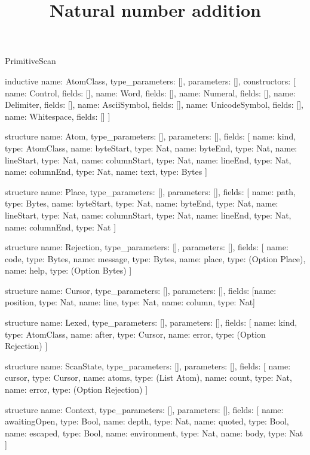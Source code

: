 \begin{lexlean}{PrimitiveScan}
\title{Natural number addition}
\begin{semanticmodule}
inductive{
  name: AtomClass,
  type_parameters: [],
  parameters: [],
  constructors: [
    {name: Control, fields: []},
    {name: Word, fields: []},
    {name: Numeral, fields: []},
    {name: Delimiter, fields: []},
    {name: AsciiSymbol, fields: []},
    {name: UnicodeSymbol, fields: []},
    {name: Whitespace, fields: []}
  ]
}

structure{
  name: Atom,
  type_parameters: [],
  parameters: [],
  fields: [
    {name: kind, type: AtomClass},
    {name: byteStart, type: Nat},
    {name: byteEnd, type: Nat},
    {name: lineStart, type: Nat},
    {name: columnStart, type: Nat},
    {name: lineEnd, type: Nat},
    {name: columnEnd, type: Nat},
    {name: text, type: Bytes}
  ]
}

structure{
  name: Place,
  type_parameters: [],
  parameters: [],
  fields: [
    {name: path, type: Bytes},
    {name: byteStart, type: Nat},
    {name: byteEnd, type: Nat},
    {name: lineStart, type: Nat},
    {name: columnStart, type: Nat},
    {name: lineEnd, type: Nat},
    {name: columnEnd, type: Nat}
  ]
}

structure{
  name: Rejection,
  type_parameters: [],
  parameters: [],
  fields: [
    {name: code, type: Bytes},
    {name: message, type: Bytes},
    {name: place, type: (Option Place)},
    {name: help, type: (Option Bytes)}
  ]
}

structure{
  name: Cursor,
  type_parameters: [],
  parameters: [],
  fields: [{name: position, type: Nat}, {name: line, type: Nat}, {name: column, type: Nat}]
}

structure{
  name: Lexed,
  type_parameters: [],
  parameters: [],
  fields: [
    {name: kind, type: AtomClass},
    {name: after, type: Cursor},
    {name: error, type: (Option Rejection)}
  ]
}

structure{
  name: ScanState,
  type_parameters: [],
  parameters: [],
  fields: [
    {name: cursor, type: Cursor},
    {name: atoms, type: (List Atom)},
    {name: count, type: Nat},
    {name: error, type: (Option Rejection)}
  ]
}

structure{
  name: Context,
  type_parameters: [],
  parameters: [],
  fields: [
    {name: awaitingOpen, type: Bool},
    {name: depth, type: Nat},
    {name: quoted, type: Bool},
    {name: escaped, type: Bool},
    {name: environment, type: Nat},
    {name: body, type: Nat}
  ]
}


\end{semanticmodule}
\end{lexlean}
